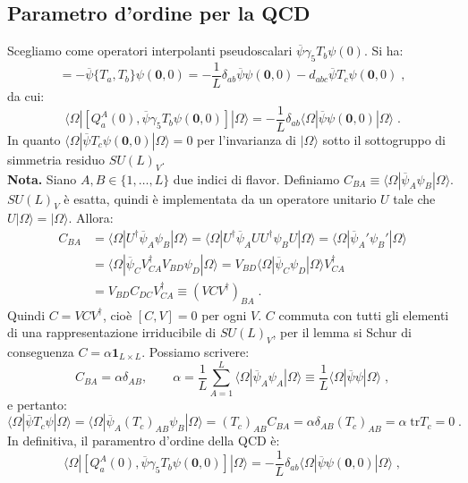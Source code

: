 \documentclass[12pt,a4paper]{article}
\theoremstyle{definition}
\newcommand{\bra}{\langle}
\newcommand{\ket}{\rangle}
\newcommand{\adj}[1]{#1^{\dagger}}
\newcommand{\tr}{\mathrm{tr}}
\numberwithin{equation}{section}
\begin{document}
\subsection{Parametro d'ordine per la QCD}
Scegliamo come operatori interpolanti pseudoscalari $\overline{\psi}\gamma_5T_b\psi(0)$. Si ha:
\begin{equation}
[Q_a^A(0),\overline{\psi}\gamma_5T_b\psi(0)]=-\overline{\psi}\{T_a,T_b\}\psi(\mathbf{0},0)=-\frac{1}{L}\delta_{ab}\overline{\psi}\psi(\mathbf{0},0)-d_{abc}\overline{\psi}T_c\psi(\mathbf{0},0)\;,
\end{equation}
da cui:
\begin{equation}
\bra\Omega|[Q_a^A(0),\overline{\psi}\gamma_5T_b\psi(\mathbf{0},0)]|\Omega\ket=-\frac{1}{L}\delta_{ab}\bra\Omega|\overline{\psi}\psi(\mathbf{0},0)|\Omega\ket\;.
\end{equation}
In quanto $\bra\Omega|\overline{\psi}T_c\psi(\mathbf{0},0)|\Omega\ket=0$ per l'invarianza di $|\Omega\ket$ sotto il sottogruppo di simmetria residuo $SU(L)_V$. \\
\textbf{Nota.} Siano $A,B\in \{1,\ldots,L\}$ due indici di flavor. Definiamo $C_{BA}\equiv \bra\Omega|\overline{\psi}_A\psi_B|\Omega\ket$. $SU(L)_V$ è esatta, quindi è implementata da un operatore unitario $U$ tale che $U|\Omega\ket=|\Omega\ket$. Allora:
\begin{align*}
C_{BA}&=\bra\Omega|\adj{U}\overline{\psi}_A\psi_B|\Omega\ket=\bra\Omega|\adj{U}\overline{\psi}_AU\adj{U}\psi_BU|\Omega\ket=\bra\Omega|\overline{\psi}_A'\psi_B'|\Omega\ket \\
&= \bra\Omega|\overline{\psi}_C\adj{V}_{CA}V_{BD}\psi_D|\Omega\ket=V_{BD}\bra\Omega|\overline{\psi}_C\psi_D|\Omega\ket\adj{V}_{CA} \\
&= V_{BD}C_{DC}\adj{V}_{CA}\equiv (VC\adj{V})_{BA}\;.
\end{align*}
Quindi $C=VC\adj{V}$, cioè $[C,V]=0$ per ogni $V$. $C$ commuta con tutti gli elementi di una rappresentazione irriducibile di $SU(L)_V$, per il lemma si Schur di conseguenza $C=\alpha \mathbf{1}_{L\times L}$. Possiamo scrivere:
$$
C_{BA}=\alpha\delta_{AB},\qquad \alpha=\frac{1}{L}\sum_{A=1}^L\bra\Omega|\overline{\psi}_A\psi_A|\Omega\ket\equiv \frac{1}{L}\bra\Omega|\overline{\psi}\psi|\Omega\ket\;,
$$
e pertanto:
$$
\bra\Omega|\overline{\psi}T_c\psi|\Omega\ket=\bra\Omega|\overline{\psi}_A(T_c)_{AB}\psi_B|\Omega\ket=(T_c)_{AB}C_{BA}=\alpha\delta_{AB}(T_c)_{AB}=\alpha\;\tr T_c=0\;.
$$
In definitiva, il paramentro d'ordine della QCD è:
\begin{equation}
\bra\Omega|[Q_a^A(0),\overline{\psi}\gamma_5T_b\psi(\mathbf{0},0)]|\Omega\ket=-\frac{1}{L}\delta_{ab}\bra\Omega|\overline{\psi}\psi(\mathbf{0},0)|\Omega\ket\;,
\end{equation}
\end{document}
